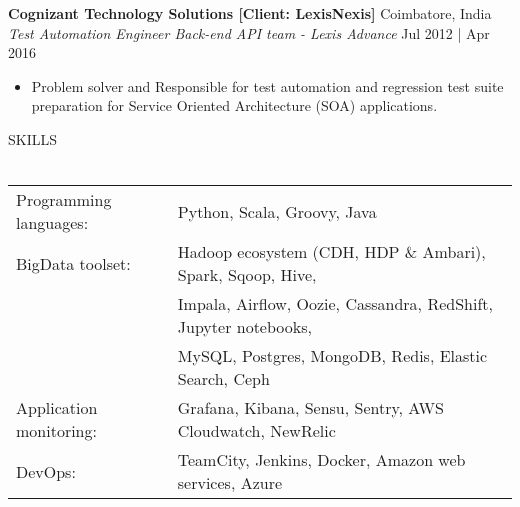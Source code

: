 \documentclass[a4paper]{article}
\newcommand{\lineunder} {
    \vspace*{-8pt} \\
    \hspace*{-18pt} \hrulefill \\
}
\newcommand{\header} [1] {
    {\hspace*{-18pt}\vspace*{6pt} \textsc{#1}}
    \vspace*{-6pt} \lineunder
}
\begin{document}
\textbf{Cognizant Technology Solutions [Client: LexisNexis]} \hfill Coimbatore, India\\
\textit{Test Automation Engineer \textbar{} Back-end API team - Lexis Advance} \hfill Jul 2012 | Apr 2016\\
\vspace{-1.5mm}
\begin{itemize} \itemsep 1pt
	\item Problem solver and Responsible for test automation and regression test suite preparation for Service Oriented Architecture (SOA) applications. 
\end{itemize}

\header{SKILLS}
\begin{tabular}{ l l}
	Programming languages:  & Python, Scala, Groovy, Java                                     
	\\
	BigData toolset:        & Hadoop ecosystem (CDH, HDP \& Ambari), Spark, Sqoop, Hive,      
	\\
	                        & Impala, Airflow, Oozie, Cassandra, RedShift, Jupyter notebooks, 
	\\
	                        & MySQL, Postgres, MongoDB, Redis, Elastic Search, Ceph           
	\\
	Application monitoring: & Grafana, Kibana, Sensu, Sentry, AWS Cloudwatch, NewRelic        
	\\
	DevOps:                 & TeamCity, Jenkins, Docker, Amazon web services, Azure           \\
\end{tabular}
\vspace{2mm}

\end{document}
